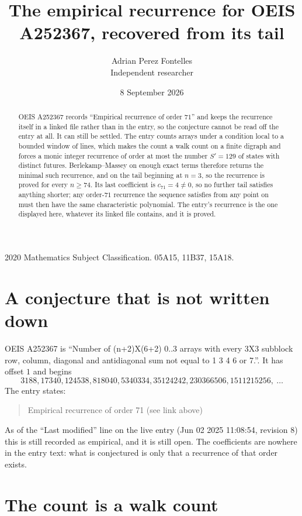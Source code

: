 \documentclass[11pt,a4paper]{article}
\title{The empirical recurrence for OEIS A252367, recovered from its tail}
\author{Adrian Perez Fontelles\\ \small Independent researcher}
\date{8 September 2026}
\theoremstyle{plain}
\theoremstyle{definition}
\begin{document}
\maketitle

\begin{abstract}
OEIS A252367 records ``Empirical recurrence of order $71$'' and keeps the recurrence itself in
a linked file rather than in the entry, so the conjecture cannot be read off the entry at all.
It can still be settled. The entry counts arrays under a condition local to a bounded window of
lines, which makes the count a walk count on a finite digraph and forces a monic integer
recurrence of order at most the number $S'=129$ of states with distinct futures. Berlekamp--Massey on
enough exact terms therefore returns the minimal such recurrence, and on the tail beginning at $n=3$, so the recurrence is proved for every $n\ge74$.
Its last coefficient is $c_{71}=4\neq0$, so no further tail satisfies anything
shorter; any order-$71$ recurrence the sequence satisfies from any point on must then have
the same characteristic polynomial. The entry's recurrence is the one displayed here, whatever
its linked file contains, and it is proved.
\end{abstract}

\noindent\small 2020 Mathematics Subject Classification. 05A15, 11B37, 15A18.\normalsize

\section{A conjecture that is not written down}

OEIS A252367 is ``Number of (n+2)X(6+2) 0..3 arrays with every 3X3 subblock row, column, diagonal and antidiagonal sum not equal to 1 3 4 6 or 7.''. It has offset $1$ and begins
\[
3188, 17340, 124538, 818040, 5340334, 35124242, 230366506, 1511215256,\ \dots
\]
The entry states:
\begin{quote}
Empirical recurrence of order 71 (see link above)
\end{quote}
As of the ``Last modified'' line on the live entry (Jun 02 2025 11:08:54, revision 8)
this is still recorded as empirical, and it is still open. The coefficients are nowhere in the
entry text: what is conjectured is only that a recurrence of that order exists.

\section{The count is a walk count}
\end{document}
